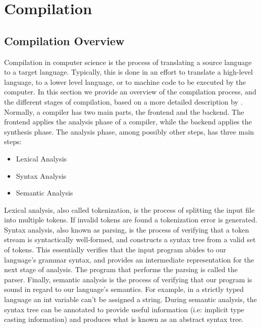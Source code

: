 \section{Compilation}
\subsection{Compilation Overview}
Compilation in computer science is the process of translating a source language
to a target language. Typically, this is done in an effort to translate a
high-level language, to a lower level language, or to machine code to be executed by
the computer. In this section we provide an overview of the compilation process,
and the different stages of compilation, based on a more detailed description by 
 \cite[p. 4-11]{Compilers}.
Normally, a compiler has two main parts, the frontend and the backend.
The frontend applies the analysis phase of a compiler, while the backend applies
the synthesis phase. The analysis phase, among possibly other steps, has three
main steps:
\begin{itemize}
  \item Lexical Analysis
  \item Syntax Analysis
  \item Semantic Analysis
\end{itemize}
Lexical analysis, also called tokenization, is the process of splitting the
input file into multiple tokens. If invalid tokens are found a tokenization
error is generated. Syntax analysis, also known as parsing, is the process of
verifying that a token stream is syntactically well-formed, and constructs a
syntax tree from a valid set of tokens. This essentially verifies that the input program
abides to our language's grammar syntax, and provides an intermediate
representation for the next stage of analysis. The program that performs the
parsing is called the parser. Finally, semantic analysis is the process of
verifying that our program is sound in regard to our language's semantics. For
example, in a strictly typed language an int variable can't be assigned a
string. During semantic analysis, the syntax tree can be annotated to provide
useful information (i.e: implicit type casting information) and produces what is
known as an abstract syntax tree.

